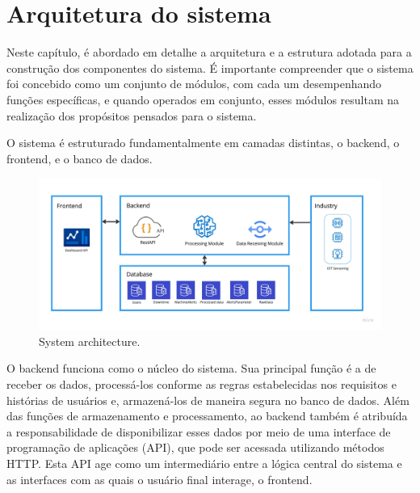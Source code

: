 


\chapter{Arquitetura do sistema}\label{cap:development}
Neste capítulo, é abordado em detalhe a arquitetura e a estrutura adotada para a construção dos componentes do sistema. É importante compreender que o sistema foi concebido como um conjunto de módulos, com cada um desempenhando funções específicas, e quando operados em conjunto, esses módulos resultam na realização dos propósitos pensados para o sistema.

O sistema é estruturado fundamentalmente em camadas distintas, o backend, o frontend, e o banco de dados.

\begin{figure}[htbp]
	\centering
	\includegraphics[width=\textwidth]{images/Architecture.jpg}
	\caption{System architecture.}
	\label{fig:systemAchitectureImage}
\end{figure}

O backend funciona como o núcleo do sistema. Sua principal função é a de receber os dados, processá-los conforme as regras estabelecidas nos requisitos e histórias de usuários e, armazená-los de maneira segura no banco de dados. Além das funções de armazenamento e processamento, ao backend também é atribuída a responsabilidade de disponibilizar esses dados por meio de uma interface de programação de aplicações (API), que pode ser acessada utilizando métodos HTTP. Esta API age como um intermediário entre a lógica central do sistema e as interfaces com as quais o usuário final interage, o frontend.

